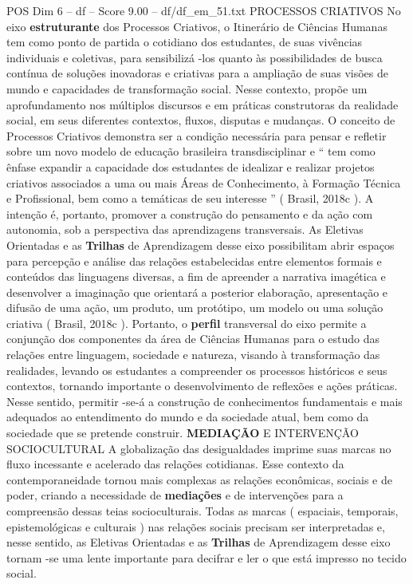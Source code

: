 \begin{textsample}{POS Dim 6 – df – Score 9.00 – df/df\_em\_51.txt}  \label{ex:f6_pos_127}
PROCESSOS CRIATIVOS No eixo \textbf{estruturante} dos Processos Criativos, o Itinerário de Ciências Humanas tem como ponto de partida o cotidiano dos estudantes, de suas vivências individuais e coletivas, para sensibilizá -los quanto às possibilidades de busca contínua de soluções inovadoras e criativas para a ampliação de suas visões de mundo e capacidades de transformação social.
Nesse contexto, propõe um aprofundamento nos múltiplos discursos e em práticas construtoras da realidade social, em seus diferentes contextos, fluxos, disputas e mudanças.
O conceito de Processos Criativos demonstra ser a condição necessária para pensar e refletir sobre um novo modelo de educação brasileira transdisciplinar e “ tem como ênfase expandir a capacidade dos estudantes de idealizar e realizar projetos criativos associados a uma ou mais Áreas de Conhecimento, à Formação Técnica e Profissional, bem como a temáticas de seu interesse ” ( Brasil, 2018c ).
A intenção é, portanto, promover a construção do pensamento e da ação com autonomia, sob a perspectiva das aprendizagens transversais.
As Eletivas Orientadas e as \textbf{Trilhas} de Aprendizagem desse eixo possibilitam abrir espaços para percepção e análise das relações estabelecidas entre elementos formais e conteúdos das linguagens diversas, a fim de apreender a narrativa imagética e desenvolver a imaginação que orientará a posterior elaboração, apresentação e difusão de uma ação, um produto, um protótipo, um modelo ou uma solução criativa ( Brasil, 2018c ).
Portanto, o \textbf{perfil} transversal do eixo permite a conjunção dos componentes da área de Ciências Humanas para o estudo das relações entre linguagem, sociedade e natureza, visando à transformação das realidades, levando os estudantes a compreender os processos históricos e seus contextos, tornando importante o desenvolvimento de reflexões e ações práticas.
Nesse sentido, permitir -se-á a construção de conhecimentos fundamentais e mais adequados ao entendimento do mundo e da sociedade atual, bem como da sociedade que se pretende construir. \textbf{MEDIAÇÃO} E INTERVENÇÃO SOCIOCULTURAL A globalização das desigualdades imprime suas marcas no fluxo incessante e acelerado das relações cotidianas.
Esse contexto da contemporaneidade tornou mais complexas as relações econômicas, sociais e de poder, criando a necessidade de \textbf{mediações} e de intervenções para a compreensão dessas teias socioculturais.
Todas as marcas ( espaciais, temporais, epistemológicas e culturais ) nas relações sociais precisam ser interpretadas e, nesse sentido, as Eletivas Orientadas e as \textbf{Trilhas} de Aprendizagem desse eixo tornam -se uma lente importante para decifrar e ler o que está impresso no tecido social.

\end{textsample}
